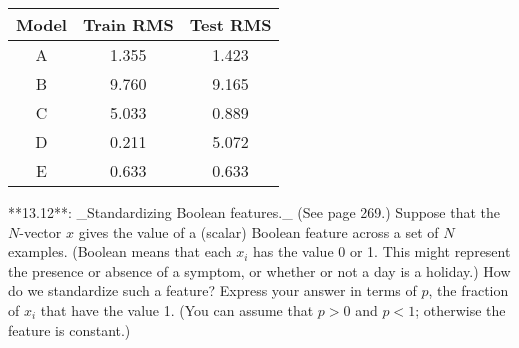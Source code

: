 \begin{tabular}{c c c} \hline \hline Model & Train RMS & Test RMS \\ \hline A & 1.355 & 1.423 \\ B & 9.760 & 9.165 \\ C & 5.033 & 0.889 \\ D & 0.211 & 5.072 \\ E & 0.633 & 0.633 \\ \hline \hline \end{tabular}
**13.12**: _Standardizing Boolean features._ (See page 269.) Suppose that the \(N\)-vector \(x\) gives the value of a (scalar) Boolean feature across a set of \(N\) examples. (Boolean means that each \(x_{i}\) has the value 0 or 1. This might represent the presence or absence of a symptom, or whether or not a day is a holiday.) How do we standardize such a feature? Express your answer in terms of \(p\), the fraction of \(x_{i}\) that have the value 1. (You can assume that \(p>0\) and \(p<1\); otherwise the feature is constant.) 